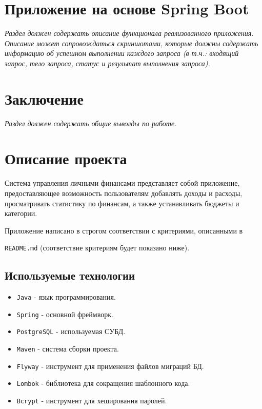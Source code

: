 \documentclass[a4paper, 14pt]{article}
\begin{document}
\newpage
\section{Приложение на основе Spring Boot}

\it{Раздел должен содержать описание функционала реализованного приложения. Описание может сопровождаться скриншотами, которые должны содержать информацию об успешном выполнении каждого запроса (в т.ч.: входящий запрос, тело запроса, статус и результат выполнения запроса).}

\newpage
\section{Заключение}

\it{Раздел должен содержать общие выволды по работе}.

\iffalse
\section{Описание проекта}

Система управления личными финансами представляет собой приложение, предоставляющее возможность пользователям добавлять доходы и расходы, просматривать статистику по финансам, а также устанавливать бюджеты и категории.

Приложение написано в строгом соответствии с критериями, описанными в

\texttt{README.md} (соответствие критериям будет показано ниже).

\subsection{Используемые технологии}

\begin{itemize}
	\item \texttt{Java} - язык программирования.
	\item \texttt{Spring} - основной фреймворк.
	\item \texttt{PostgreSQL} - используемая СУБД.
	\item \texttt{Maven} - система сборки проекта.
	\item \texttt{Flyway} - инструмент для применения файлов миграций БД.
	\item \texttt{Lombok} - библиотека для сокращения шаблонного кода.
	\item \texttt{Bcrypt} - инструмент для хеширования паролей.
\end{itemize}
\end{document}
